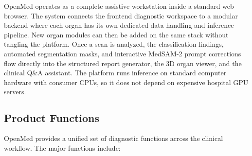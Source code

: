 \documentclass[12pt,a4paper]{report}
\begin{document}
OpenMed operates as a complete assistive workstation inside a standard web browser. The system connects the frontend diagnostic workspace to a modular backend where each organ has its own dedicated data handling and inference pipeline. New organ modules can then be added on the same stack without tangling the platform. Once a scan is analyzed, the classification findings, automated segmentation masks, and interactive MedSAM-2 prompt corrections flow directly into the structured report generator, the 3D organ viewer, and the clinical Q\&A assistant. The platform runs inference on standard computer hardware with consumer CPUs, so it does not depend on expensive hospital GPU servers.

\subsection{Product Functions}
OpenMed provides a unified set of diagnostic functions across the clinical workflow. The major functions include:
\end{document}
